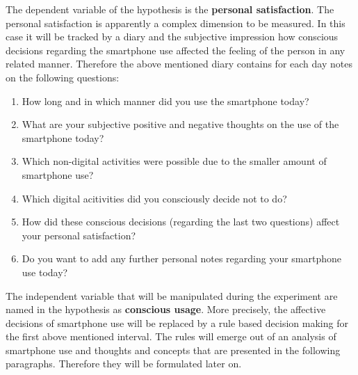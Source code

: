\documentclass[11pt,letterpaper]{article}
\begin{document}
The dependent variable of the hypothesis is the \textbf{personal satisfaction}. The personal satisfaction is apparently a complex dimension to be measured. In this case it will be tracked by a diary and the subjective impression how conscious decisions regarding the smartphone use affected the feeling of the person in any related manner. Therefore the above mentioned diary contains for each day notes on the following questions:
\begin{enumerate}
\item 
How long and in which manner did you use the smartphone today?

\item
What are your subjective positive and negative thoughts on the use of the smartphone today?

\item
Which non-digital activities were possible due to the smaller amount of smartphone use?

\item
Which digital acitivities did you consciously decide not to do?

\item
How did these conscious decisions (regarding the last two questions) affect your personal satisfaction?

\item
Do you want to add any further personal notes regarding your smartphone use today?

\end{enumerate}

The independent variable that will be manipulated during the experiment are named in the hypothesis as \textbf{conscious usage}. More precisely, the affective decisions of smartphone use will be replaced by a rule based decision making for the first above mentioned interval. The rules will emerge out of an analysis of smartphone use and thoughts and concepts that are presented in the following paragraphs. Therefore they will be formulated later on.
\end{document}
